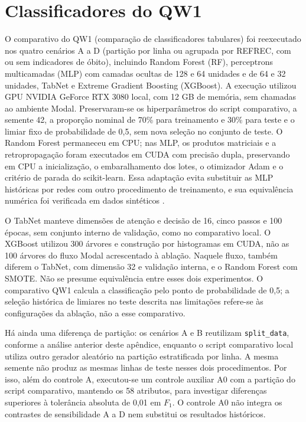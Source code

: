 \section{Classificadores do QW1}\label{sec:sensibilidade-qw1}

O comparativo do QW1 (comparação de classificadores tabulares) foi reexecutado nos quatro cenários A a D (partição por linha ou agrupada por REFREC, com ou sem indicadores de óbito), incluindo Random Forest (RF), perceptrons multicamadas (MLP) com camadas ocultas de 128 e 64 unidades e de 64 e 32 unidades, TabNet e Extreme Gradient Boosting (XGBoost). A execução utilizou GPU NVIDIA GeForce RTX 3080 local, com 12 GB de memória, sem chamadas ao ambiente Modal. Preservaram-se os hiperparâmetros do script comparativo, a semente 42, a proporção nominal de 70\% para treinamento e 30\% para teste e o limiar fixo de probabilidade de 0,5, sem nova seleção no conjunto de teste. O Random Forest permaneceu em CPU; nas MLP, os produtos matriciais e a retropropagação foram executados em CUDA com precisão dupla, preservando em CPU a inicialização, o embaralhamento dos lotes, o otimizador Adam e o critério de parada do scikit-learn. Essa adaptação evita substituir as MLP históricas por redes com outro procedimento de treinamento, e sua equivalência numérica foi verificada em dados sintéticos \cite{Jardim2026phdrepo}.

O TabNet manteve dimensões de atenção e decisão de 16, cinco passos e 100 épocas, sem conjunto interno de validação, como no comparativo local. O XGBoost utilizou 300 árvores e construção por histogramas em CUDA, não as 100 árvores do fluxo Modal acrescentado à ablação. Naquele fluxo, também diferem o TabNet, com dimensão 32 e validação interna, e o Random Forest com SMOTE. Não se presume equivalência entre esses dois experimentos. O comparativo QW1 calcula a classificação pelo ponto de probabilidade de 0,5; a seleção histórica de limiares no teste descrita nas limitações refere-se às configurações da ablação, não a esse comparativo.

Há ainda uma diferença de partição: os cenários A e B reutilizam \texttt{split\_data}, conforme a análise anterior deste apêndice, enquanto o script comparativo local utiliza outro gerador aleatório na partição estratificada por linha. A mesma semente não produz as mesmas linhas de teste nesses dois procedimentos. Por isso, além do controle A, executou-se um controle auxiliar A0 com a partição do script comparativo, mantendo os 58 atributos, para investigar diferenças superiores à tolerância absoluta de 0,01 em $F_1$. O controle A0 não integra os contrastes de sensibilidade A a D nem substitui os resultados históricos.

